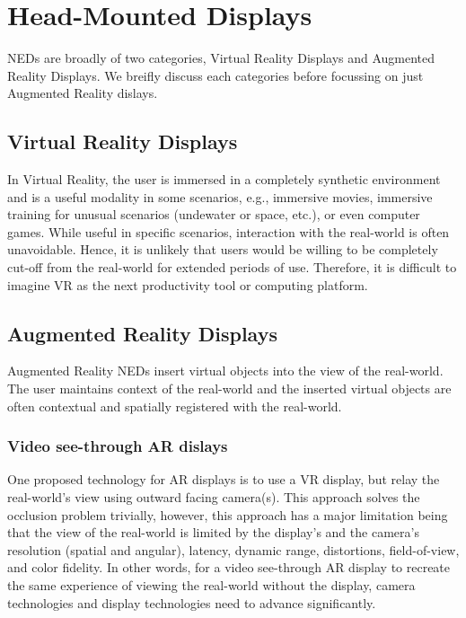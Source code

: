 \section{Head-Mounted Displays}
NEDs are broadly of two categories, Virtual Reality Displays and Augmented Reality Displays. 
We breifly discuss each categories before focussing on just Augmented Reality dislays.

\subsection{Virtual Reality Displays}
\label{sec:background:vr_displays}
In Virtual Reality, the user is immersed in a completely synthetic environment and is a useful modality in some scenarios, e.g., immersive movies, immersive training for unusual scenarios (undewater or space, etc.), or even computer games. 
While useful in specific scenarios, interaction with the real-world is often unavoidable. 
Hence, it is unlikely that users would be willing to be completely cut-off from the real-world for extended periods of use. 
Therefore, it is difficult to imagine VR as the next productivity tool or computing platform.

\subsection{Augmented Reality Displays}
\label{sec:background:ar_displays}
Augmented Reality NEDs insert virtual objects into the view of the real-world. 
The user maintains context of the real-world and the inserted virtual objects are often contextual and spatially registered with the real-world.

\subsubsection{Video see-through AR dislays}
\label{sec:background:vst_displays}
One proposed technology for AR displays is to use a VR display, but relay the real-world’s view using outward facing camera(s). 
This approach solves the occlusion problem trivially, however, this approach has a major limitation being that the view of the real-world is limited by the display’s and the camera’s resolution (spatial and angular), latency, dynamic range, distortions, field-of-view, and color fidelity. 
In other words, for a video see-through AR display to recreate the same experience of viewing the real-world without the display, camera technologies and display technologies need to advance significantly.

